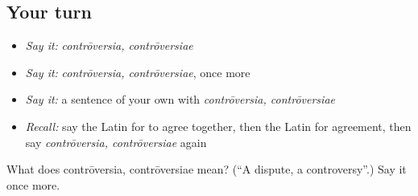 \subsection*{Your turn}
\begin{itemize}
\raggedright
  \item \emph{Say it:} \emph{contrōversia, contrōversiae}
  \item \emph{Say it:} \emph{contrōversia, contrōversiae}, once more
  \item \emph{Say it:} a sentence of your own with \emph{contrōversia, contrōversiae}
  \item \emph{Recall:} say the Latin for to agree together, then the Latin for agreement, then say \emph{contrōversia, contrōversiae} again
\end{itemize}

\begin{tcolorbox}[breakable,colback=teal!4,colframe=teal!35!black,title={Before you move on}]
What does contrōversia, contrōversiae mean? (\textquotedblleft{}A dispute, a controversy\textquotedblright{}.) Say it once more.
\end{tcolorbox}
